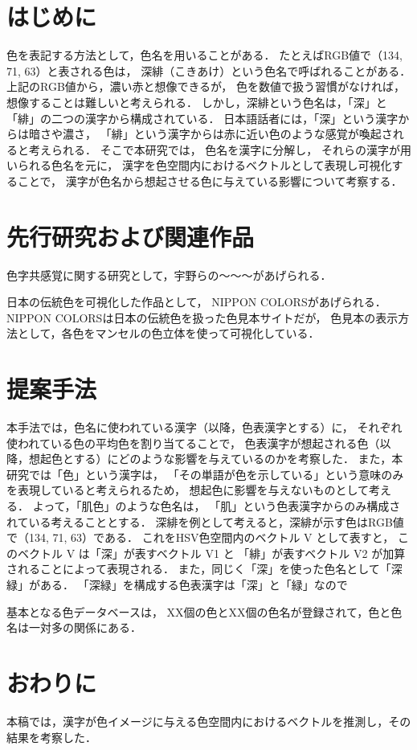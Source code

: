 \documentclass[a4j,twocolumn]{ujarticle} %
\begin{document}
\maketitle
\thispagestyle{myheadings}

\section{はじめに}

色を表記する方法として，色名を用いることがある．
たとえばRGB値で（134, 71, 63）と表される色は，
深緋（こきあけ）という色名で呼ばれることがある．
上記のRGB値から，濃い赤と想像できるが，
色を数値で扱う習慣がなければ，想像することは難しいと考えられる．
しかし，深緋という色名は，「深」と「緋」の二つの漢字から構成されている．
日本語話者には，「深」という漢字からは暗さや濃さ，
「緋」という漢字からは赤に近い色のような感覚が喚起されると考えられる．
そこで本研究では，
色名を漢字に分解し，
それらの漢字が用いられる色名を元に，
漢字を色空間内におけるベクトルとして表現し可視化することで，
漢字が色名から想起させる色に与えている影響について考察する．

\section{先行研究および関連作品}

色字共感覚に関する研究として，宇野ら\cite{Uno2018}の〜〜〜があげられる．

日本の伝統色を可視化した作品として，
NIPPON COLORS\cite{NipponColors}があげられる．
NIPPON COLORSは日本の伝統色を扱った色見本サイトだが，
色見本の表示方法として，各色をマンセルの色立体を使って可視化している．

\section{提案手法}

本手法では，色名に使われている漢字（以降，色表漢字とする）に，
それぞれ使われている色の平均色を割り当てることで，
色表漢字が想起される色（以降，想起色とする）にどのような影響を与えているのかを考察した．
また，本研究では「色」という漢字は，
「その単語が色を示している」という意味のみを表現していると考えられるため，
想起色に影響を与えないものとして考える．
よって，「肌色」のような色名は，
「肌」という色表漢字からのみ構成されている考えることとする．
深緋を例として考えると，深緋が示す色はRGB値で（134, 71, 63）である．
これをHSV色空間内のベクトル V として表すと，
このベクトル V は「深」が表すベクトル V1 と
「緋」が表すベクトル V2 が加算されることによって表現される．
また，同じく「深」を使った色名として「深緑」がある．
「深緑」を構成する色表漢字は「深」と「緑」なので

基本となる色データベースは，
XX個の色とXX個の色名が登録されて，色と色名は一対多の関係にある．

\section{おわりに}

本稿では，漢字が色イメージに与える色空間内におけるベクトルを推測し，その結果を考察した．




\end{document}
